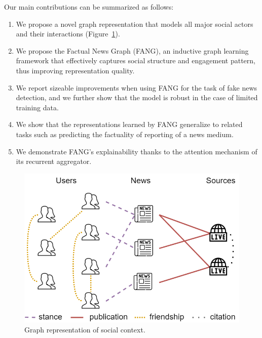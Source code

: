 \documentclass[sigconf,anonymous]{acmart}
\theoremstyle{definition}
\theoremstyle{hypothesis}
\begin{document}
Our main contributions can be summarized as follows:
\begin{enumerate}
    \item We propose a novel graph representation that models all major social actors and their interactions (Figure~\ref{fig:social_graph}). 
    \item We propose the Factual News Graph (FANG), an inductive graph learning framework that effectively captures social structure and engagement pattern, thus improving representation quality.
    \item We report sizeable improvements when using FANG for the task of fake news detection, and we further show that the model is robust in the case of limited training data.
    \item We show that the representations learned by FANG generalize to related tasks such as predicting the factuality of reporting of a news medium.
    \item We demonstrate FANG's explainability thanks to the attention mechanism of its recurrent aggregator.
\end{enumerate}

\begin{figure}[t]
\centering
\includegraphics[scale=0.25]{fang_graph.png}
\caption{Graph representation of social context.}
\label{fig:social_graph}
\end{figure}
\end{document}
